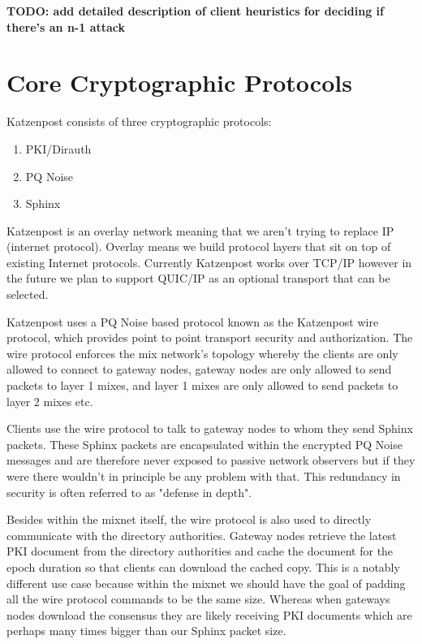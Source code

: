 \documentclass{article}
\begin{document}
\vspace{1cm}

\textbf{TODO: add detailed description of client heuristics for deciding if there's an n-1 attack}



\pagebreak
\section{Core Cryptographic Protocols}

Katzenpost consists of three cryptographic protocols:\\

\begin{enumerate}
    \item PKI/Dirauth
    \item PQ Noise
    \item Sphinx
\end{enumerate}

\vspace{.5cm}

Katzenpost is an overlay network meaning that we aren't trying to replace IP (internet protocol).
Overlay means we build protocol layers that sit on top of existing Internet protocols.
Currently Katzenpost works over TCP/IP however in the future we plan to support QUIC/IP
as an optional transport that can be selected.

Katzenpost uses a PQ Noise based protocol known as the Katzenpost wire protocol, which
provides point to point transport security and authorization. The wire protocol enforces the mix network's topology
whereby the clients are only allowed to connect to gateway nodes, gateway nodes are only allowed to send packets to layer 1 mixes,
and layer 1 mixes are only allowed to send packets to layer 2 mixes etc.

Clients use the wire protocol to talk to gateway nodes to whom they send Sphinx packets. These Sphinx packets are encapsulated
within the encrypted PQ Noise messages and are therefore never exposed to passive network observers but if they were there
wouldn't in principle be any problem with that. This redundancy in security is often referred to as "defense in depth".

Besides within the mixnet itself, the wire protocol is also used to directly communicate with the directory authorities. Gateway nodes
retrieve the latest PKI document from the directory authorities and cache the document for the epoch duration so that clients can download the cached copy. This is a notably different use case because within the mixnet we should have the goal of padding all the wire protocol commands
to be the same size. Whereas when gateways nodes download the consensus they are likely receiving PKI documents which are perhaps many times bigger than our Sphinx packet size.
\end{document}
